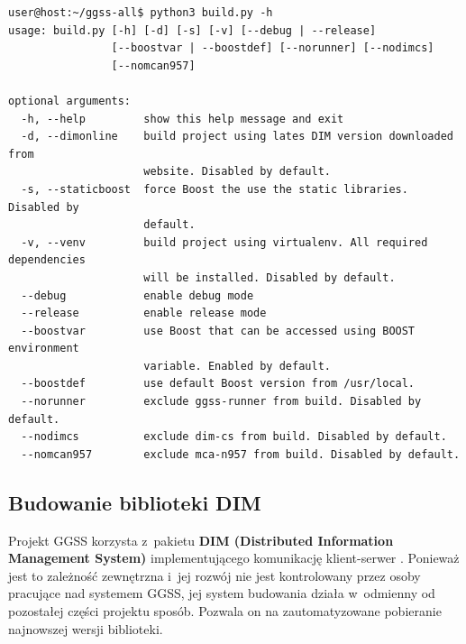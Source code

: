 \begin{lstlisting}[language=Cmd, caption={Użycie skryptu \textit{build.py} z~opcją \textit{-h} powodujące wyświetlenie możliwych do wykorzystania parametrów. Widoczne m.in. parametry \textit{nomcan957}, \textit{nodimcs} oraz \textit{norunner} pozwalające użytkownikowi na wykluczenie niektórych aplikacji wchodzących w~skład projektu GGSS z~procesu budowania.}, label={lst:buildpy2}]
user@host:~/ggss-all$ python3 build.py -h
usage: build.py [-h] [-d] [-s] [-v] [--debug | --release]
                [--boostvar | --boostdef] [--norunner] [--nodimcs]
                [--nomcan957]

optional arguments:
  -h, --help         show this help message and exit
  -d, --dimonline    build project using lates DIM version downloaded from
                     website. Disabled by default.
  -s, --staticboost  force Boost the use the static libraries. Disabled by
                     default.
  -v, --venv         build project using virtualenv. All required dependencies
                     will be installed. Disabled by default.
  --debug            enable debug mode
  --release          enable release mode
  --boostvar         use Boost that can be accessed using BOOST environment
                     variable. Enabled by default.
  --boostdef         use default Boost version from /usr/local.
  --norunner         exclude ggss-runner from build. Disabled by default.
  --nodimcs          exclude dim-cs from build. Disabled by default.
  --nomcan957        exclude mca-n957 from build. Disabled by default.

\end{lstlisting}


\subsection{Budowanie biblioteki DIM}
Projekt GGSS korzysta z~pakietu \textbf{DIM (Distributed Information Management System)} implementującego komunikację klient-serwer \cite{DIMwebsite}. Ponieważ jest to zależność zewnętrzna i~jej rozwój nie jest kontrolowany przez osoby pracujące nad systemem GGSS, jej system budowania działa w~odmienny od pozostałej części projektu sposób. Pozwala on na zautomatyzowane pobieranie najnowszej wersji biblioteki.

